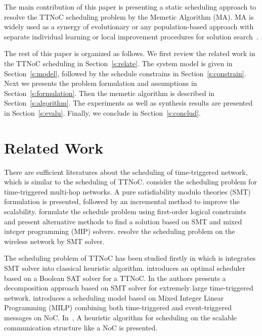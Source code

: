 \documentclass[journal]{IEEEtran}
\begin{document}
The main contribution of this paper is presenting a static scheduling approach to resolve the TTNoC scheduling problem by the Memetic Algorithm (MA). MA is widely used as a synergy of evolutionary or any population-based approach with separate individual learning or local improvement procedures for solution search~\cite{DBLP:journals/tec/ChenOLT11}. 

The rest of this paper is organized as follows. We first review the related work in the TTNoC scheduling in Section~\ref{s:relate}. 
The system model is given in Section~\ref{s:model}, followed by the schedule constrains in Section~\ref{s:constrain}.
Next we presents the problem formulation and assumptions in Section~\ref{s:formulation}.
Then the memetic algorithm is described in Section~\ref{s:algorithm}.
The experiments as well as synthesis results are presented in Section~\ref{s:evalu}.
Finally, we conclude in Section~\ref{s:conclud}.

\section{Related Work	\label{s:relate}}

There are sufficient literatures about the scheduling of time-triggered network, which is similar to the scheduling of TTNoC. 
\cite{DBLP:conf/rtss/Steiner10} consider the scheduling problem for time-triggered multi-hop networks. 
A pure satisfiability modulo theories (SMT) formulation is presented, followed by an incremental method to improve the scalability.
\cite{DBLP:journals/rts/CraciunasO16,DBLP:conf/rtns/CraciunasO14} formulate the schedule problem using first-order logical constraints and present alternative methods to find a solution based on SMT and mixed integer programming (MIP) solvers.
\cite{DBLP:conf/isorc/RoRM15} resolve the scheduling problem on the wireless network by SMT solver.

The scheduling problem of TTNoC has been
studied firstly in \cite{DBLP:conf/date/HuangBRBK12} which is integrates SMT solver into classical heuristic algorithm. 
\cite{DBLP:conf/sies/ScholerKMO15} introduces an optimal scheduler based on a Boolean SAT solver for a TTNoC.
In \cite{DBLP:conf/etfa/PozoSRH15} the authors presents a decomposition approach based on SMT solver for extremely large time-triggered network.
\cite{DBLP:conf/indin/MurshedOAK15} introduces a scheduling model based on Mixed Integer Linear Programming (MILP) combining both time-triggered and event-triggered messages on NoC.
In~\cite{DBLP:conf/sies/FreierC15}, 
A heuristic algorithm for scheduling on the scalable communication structure like a NoC is presented. 
\end{document}
